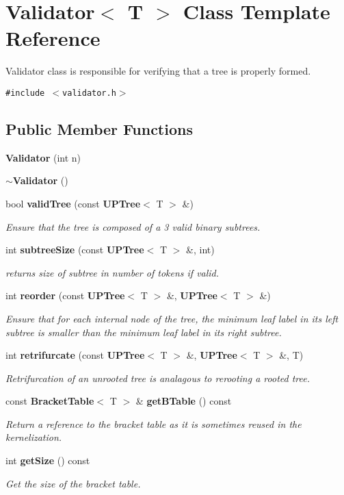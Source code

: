 \section{Validator$<$ T $>$ Class Template Reference}
\label{classValidator}
Validator class is responsible for verifying that a tree is properly formed.  


{\tt \#include $<$validator.h$>$}

\subsection*{Public Member Functions}
\begin{CompactItemize}
\item 
{\bf Validator} (int n)
\item 
{\bf $\sim$Validator} ()
\item 
bool {\bf valid\-Tree} (const {\bf UPTree}$<$ T $>$ \&)
\begin{CompactList}\small\item\em Ensure that the tree is composed of a 3 valid binary subtrees. \item\end{CompactList}\item 
int {\bf subtree\-Size} (const {\bf UPTree}$<$ T $>$ \&, int)
\begin{CompactList}\small\item\em returns size of subtree in number of tokens if valid. \item\end{CompactList}\item 
int {\bf reorder} (const {\bf UPTree}$<$ T $>$ \&, {\bf UPTree}$<$ T $>$ \&)
\begin{CompactList}\small\item\em Ensure that for each internal node of the tree, the minimum leaf label in its left subtree is smaller than the minimum leaf label in its right subtree. \item\end{CompactList}\item 
int {\bf retrifurcate} (const {\bf UPTree}$<$ T $>$ \&, {\bf UPTree}$<$ T $>$ \&, T)
\begin{CompactList}\small\item\em Retrifurcation of an unrooted tree is analagous to rerooting a rooted tree. \item\end{CompactList}\item 
const {\bf Bracket\-Table}$<$ T $>$ \& {\bf get\-BTable} () const 
\begin{CompactList}\small\item\em Return a reference to the bracket table as it is sometimes reused in the kernelization. \item\end{CompactList}\item 
int {\bf get\-Size} () const 
\begin{CompactList}\small\item\em Get the size of the bracket table. \item\end{CompactList}\end{CompactItemize}
